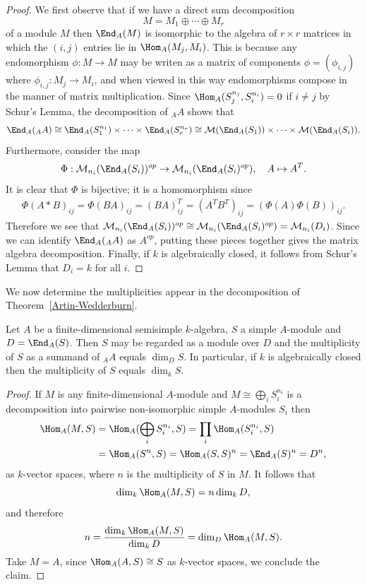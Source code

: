 \begin{proof}
We first observe that if we have a direct sum decomposition
\[M=M_1\oplus\cdots\oplus M_r\]
of a module $M$ then $\End_A(M)$ is isomorphic to the algebra of $r\times r$ matrices in which the $(i,j)$ entries lie in $\Hom_A(M_j,M_i)$. This is because any endomorphism $\phi:M\to M$ may be writen as a matrix of components $\phi=(\phi_{i,j})$ where $\phi_{i,j}:M_j\to M_i$, and when viewed in this way endomorphisms compose in the manner of matrix multiplication. Since $\Hom_A(S_j^{n_j},S_i^{n_i})=0$ if $i\neq j$ by Schur's Lemma, the decomposition of $_{A}A$ shows that
\[\End_A(_{A}A)\cong \End_A(S_1^{n_1})\times\cdots\times\End_A(S_r^{n_r})\cong\mathcal{M}(\End_A(S_1))\times\cdots\times\mathcal{M}(\End_A(S_i)).\]
Furthermore, consider the map
\[\Phi:\mathcal{M}_{n_i}(\End_A(S_i))^{op}\to\mathcal{M}_{n_i}(\End_A(S_i)^{op}),\quad A\mapsto A^T.\]
It is clear that $\Phi$ is bijective; it is a homomorphism since
\begin{align*}
\Phi(A\ast B)_{ij}=\Phi(BA)_{ij}=(BA)^T_{ij}=(A^TB^T)_{ij}=(\Phi(A)\Phi(B))_{ij}.
\end{align*}
Therefore we see that $\mathcal{M}_{n_i}(\End_A(S_i))^{op}\cong\mathcal{M}_{n_i}(\End_A(S_i)^{op})=\mathcal{M}_{n_i}(D_i)$. Since we can identify $\End_A(_{A}A)$ as $A^{op}$, putting these pieces together gives the matrix algebra decomposition. Finally, if $k$ is algebraically closed, it follows from Schur's Lemma that $D_i=k$ for all $i$.
\end{proof}
We now determine the multiplicities appear in the decomposition of Theorem~\ref{Artin-Wedderburn}.
\begin{proposition}\label{Artin-Wedderburn multiplicity}
Let $A$ be a finite-dimensional semisimple $k$-algebra, $S$ a simple $A$-module and $D=\End_A(S)$. Then $S$ may be regarded as a module over $D$ and the multiplicity of $S$ as a summand of $_{A}A$ equals $\dim_DS$. In particular, if $k$ is algebraically closed then the multiplicity of $S$ equals $\dim_k S$.
\end{proposition}
\begin{proof}
If $M$ is any finite-dimensional $A$-module and $M\cong\bigoplus_iS_i^{n_i}$ is a decomposition into pairwise non-isomorphic simple $A$-modules $S_i$ then
\begin{align*}
\Hom_A(M,S)&=\Hom_A(\bigoplus_iS_i^{n_i},S)=\prod_{i}\Hom_A(S_i^{n_i},S)\\
&=\Hom_A(S^n,S)=\Hom_A(S,S)^n=\End_A(S)^n=D^n,
\end{align*}
as $k$-vector spaces, where $n$ is the multiplicity of $S$ in $M$. It follows that
\[\dim_k\Hom_A(M,S)=n\dim_kD,\]
and therefore
\[n=\frac{\dim_k\Hom_A(M,S)}{\dim_kD}=\dim_{D}\Hom_A(M,S).\]
Take $M=A$, since $\Hom_A(A,S)\cong S$ as $k$-vector spaces, we conclude the claim.
\end{proof}
